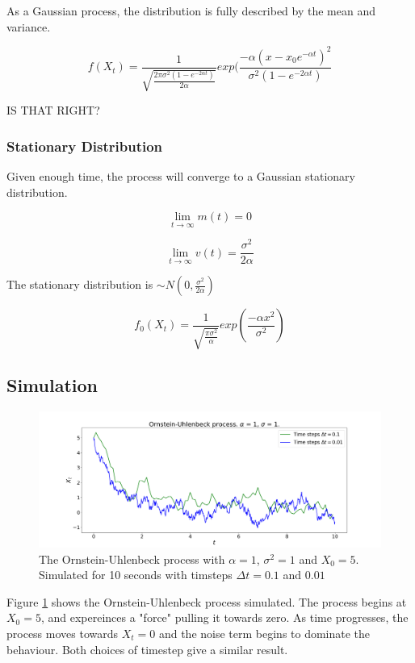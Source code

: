 \documentclass{article}
\begin{document}
As a Gaussian process, the distribution is fully described by the mean and variance.

$$f(X_t) = \dfrac{1}{\sqrt{\frac{2 \pi \sigma^2 (1-e^{-2 \alpha t})}{2 \alpha}}}exp(\frac{- \alpha (x - x_0 e^{- \alpha t})^2}{\sigma^2 (1-e^{-2 \alpha t})}$$

IS THAT RIGHT?

\subsubsection{Stationary Distribution}

Given enough time, the process will converge to a Gaussian stationary distribution.  

$$\lim_{t \to \infty} m(t) = 0$$

$$\lim_{t \to \infty} v(t) = \frac{\sigma^2}{2 \alpha}$$

The stationary distribution is $\sim N(0,\frac{\sigma^2}{2 \alpha})$ 

$$f_0(X_t) = \dfrac{1}{\sqrt{\frac{\pi \sigma^2}{\alpha}}}exp(\frac{- \alpha x^2}{\sigma^2})$$

\subsection{Simulation}

\begin{figure}[H]
\includegraphics[scale=0.25]{ou_process_a.png} 
\caption{The Ornstein-Uhlenbeck process with $\alpha=1$, $\sigma^2=1$ and $X_0 = 5$. Simulated for 10 seconds with timsteps $\Delta t =0.1$ and $0.01$}
\label{fig:ou_process}
\end{figure}

Figure \ref{fig:ou_process} shows the Ornstein-Uhlenbeck process simulated. The process begins at $X_0=5$, and expereinces a "force" pulling it towards zero. As time progresses, the process moves towards $X_t=0$ and the noise term begins to dominate the behaviour. Both choices of timestep give a similar result.
\end{document}
